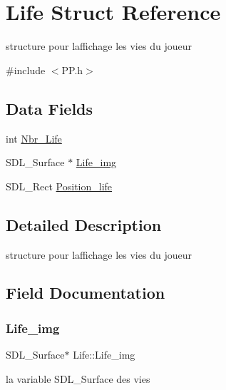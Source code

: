 \hypertarget{structLife}{}\section{Life Struct Reference}
\label{structLife}


structure pour l\textquotesingle{}affichage les vies du joueur  




{\ttfamily \#include $<$P\+P.\+h$>$}

\subsection*{Data Fields}
\begin{DoxyCompactItemize}
\item 
int \hyperlink{structLife_acf338f9197d398ce4e796accbde75266}{Nbr\+\_\+\+Life}
\item 
S\+D\+L\+\_\+\+Surface $\ast$ \hyperlink{structLife_a019e5fa5af83a0e1ecb5de0a09540f19}{Life\+\_\+img}
\item 
S\+D\+L\+\_\+\+Rect \hyperlink{structLife_ac23b346f3b87e8259cd5766521ee3f01}{Position\+\_\+life}
\end{DoxyCompactItemize}


\subsection{Detailed Description}
structure pour l\textquotesingle{}affichage les vies du joueur 

\subsection{Field Documentation}
\mbox{\label{structLife_a019e5fa5af83a0e1ecb5de0a09540f19}} 
\subsubsection{\texorpdfstring{Life\+\_\+img}{Life\_img}}
{\footnotesize\ttfamily S\+D\+L\+\_\+\+Surface$\ast$ Life\+::\+Life\+\_\+img}

la variable S\+D\+L\+\_\+\+Surface des vies \mbox{\label{structLife_acf338f9197d398ce4e796accbde75266}} 

